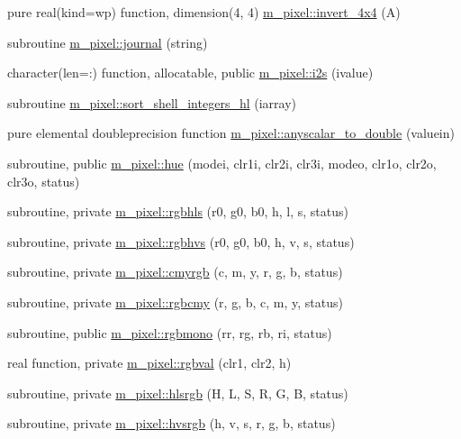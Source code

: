\begin{DoxyCompactItemize}
\item 
pure real(kind=wp) function, dimension(4, 4) \mbox{\hyperlink{namespacem__pixel_a630b892544962a88d91b1ab983dc5649}{m\+\_\+pixel\+::invert\+\_\+4x4}} (A)
\item 
subroutine \mbox{\hyperlink{namespacem__pixel_ac39c9efa849915aff58657e2df03fe3c}{m\+\_\+pixel\+::journal}} (string)
\item 
character(len=\+:) function, allocatable, public \mbox{\hyperlink{namespacem__pixel_a4d23e0d3f4de5b3652a4eb5a61d7dc8d}{m\+\_\+pixel\+::i2s}} (ivalue)
\item 
subroutine \mbox{\hyperlink{namespacem__pixel_a4396c3ff36a080fbbfa859348203d0c7}{m\+\_\+pixel\+::sort\+\_\+shell\+\_\+integers\+\_\+hl}} (iarray)
\item 
pure elemental doubleprecision function \mbox{\hyperlink{namespacem__pixel_a18d90bca3489d1280c4326e51b5cb7b3}{m\+\_\+pixel\+::anyscalar\+\_\+to\+\_\+double}} (valuein)
\item 
subroutine, public \mbox{\hyperlink{namespacem__pixel_aa76d2ac385f3ad0bc2b555cc14b7d53f}{m\+\_\+pixel\+::hue}} (modei, clr1i, clr2i, clr3i, modeo, clr1o, clr2o, clr3o, status)
\item 
subroutine, private \mbox{\hyperlink{namespacem__pixel_a02bb73b68aeae5056ccf76868146b1b4}{m\+\_\+pixel\+::rgbhls}} (r0, g0, b0, h, l, s, status)
\item 
subroutine, private \mbox{\hyperlink{namespacem__pixel_a07ffb197bdcd075f5375e95b43c18915}{m\+\_\+pixel\+::rgbhvs}} (r0, g0, b0, h, v, s, status)
\item 
subroutine, private \mbox{\hyperlink{namespacem__pixel_a98c49513d301803bb2c5cd28b8ccdba3}{m\+\_\+pixel\+::cmyrgb}} (c, m, y, r, g, b, status)
\item 
subroutine, private \mbox{\hyperlink{namespacem__pixel_a4dd5383ae0616511d16c996903a971dc}{m\+\_\+pixel\+::rgbcmy}} (r, g, b, c, m, y, status)
\item 
subroutine, public \mbox{\hyperlink{namespacem__pixel_a63a581cda811571c9ded805516f9d709}{m\+\_\+pixel\+::rgbmono}} (rr, rg, rb, ri, status)
\item 
real function, private \mbox{\hyperlink{namespacem__pixel_a9f8175d7b5b349cd5c30a99100eef5c5}{m\+\_\+pixel\+::rgbval}} (clr1, clr2, h)
\item 
subroutine, private \mbox{\hyperlink{namespacem__pixel_a854b4980c2694d7c33b2830a225eeca0}{m\+\_\+pixel\+::hlsrgb}} (H, L, S, R, G, B, status)
\item 
subroutine, private \mbox{\hyperlink{namespacem__pixel_a6eda5641d5c42b51d9488bd7ea743744}{m\+\_\+pixel\+::hvsrgb}} (h, v, s, r, g, b, status)

\end{DoxyCompactItemize}
